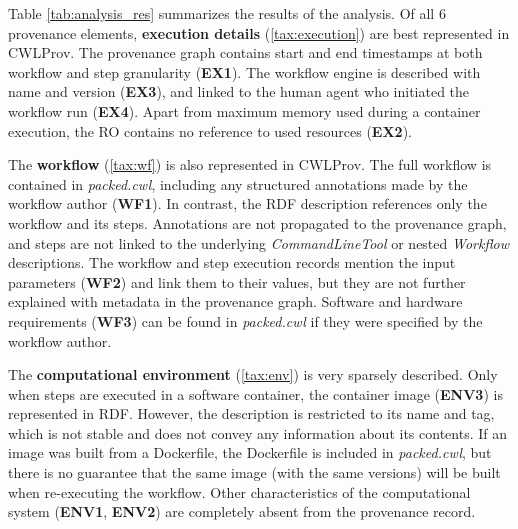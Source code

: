Table \ref{tab:analysis_res} summarizes the  results of the analysis.
Of all 6 provenance elements, \textbf{execution details} (\ref{tax:execution}) are best represented in CWLProv. The provenance graph contains start and end timestamps at both workflow and step granularity %
(\textbf{EX1}). The workflow engine is described with name and version (\textbf{EX3}), and linked to the human agent who initiated the workflow run (\textbf{EX4}). Apart from maximum memory used during a container execution, the RO contains no reference to used resources (\textbf{EX2}). 

The \textbf{workflow} (\ref{tax:wf}) is also represented in CWLProv. The full workflow is contained in \emph{packed.cwl}, including any structured annotations made by the workflow author (\textbf{WF1}). In contrast, the RDF description references only the workflow and its steps. Annotations are not propagated to the provenance graph, and steps are not linked to the underlying \emph{CommandLineTool} or nested \emph{Workflow} descriptions. The workflow and step execution records mention the input parameters (\textbf{WF2}) and link them to their values, but they are not further explained with metadata in the provenance graph. 
Software and hardware requirements (\textbf{WF3}) can be found in \emph{packed.cwl} if they were specified by the workflow author.

The \textbf{computational environment} (\ref{tax:env}) is very sparsely described. Only when steps are executed in a software container, the container image (\textbf{ENV3}) is represented in RDF. However, the description is restricted to its name and tag, which is not stable and does not convey any information about its contents. If an image was built from a Dockerfile, the Dockerfile is included in \emph{packed.cwl}, but there is no guarantee that the same image (with the same versions) will be built when re-executing the workflow. Other characteristics of the computational system (\textbf{ENV1}, \textbf{ENV2}) are completely absent from the provenance record.

